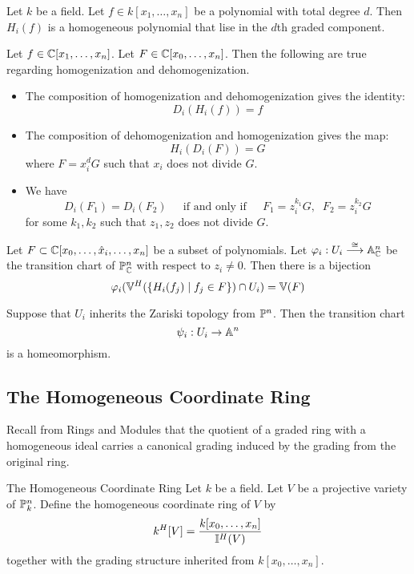 \documentclass[a4paper]{article}
\begin{document}
\begin{lmm}{}{} Let $k$ be a field. Let $f\in k[x_1,\dots,x_n]$ be a polynomial with total degree $d$. Then $H_i(f)$ is a homogeneous polynomial that lise in the $d$th graded component. 
\end{lmm}

\begin{prp}{}{} Let $f\in\mathbb{C}[x_1,\dots,x_n]$. Let $F\in\mathbb{C}[x_0,\dots,x_n]$. Then the following are true regarding homogenization and dehomogenization. 
\begin{itemize}
\item The composition of homogenization and dehomogenization gives the identity: $$D_i(H_i(f))=f$$
\item The composition of dehomogenization and homogenization gives the map: $$H_i(D_i(F))=G$$ where $F=x_i^dG$ such that $x_i$ does not divide $G$. 
\item We have $$D_i(F_1)=D_i(F_2)\;\;\;\;\text{ if and only if }\;\;\;\;F_1=z_i^{k_1}G,\;\;F_2=z_i^{k_2}G$$ for some $k_1,k_2$ such that $z_1,z_2$ does not divide $G$. 
\end{itemize}
\end{prp}

\begin{crl}{}{} Let $F\subset\mathbb{C}[x_0,\dots,\hat{x}_i,\dots,x_n]$ be a subset of polynomials. Let $\varphi_i:U_i\overset{\cong}{\longrightarrow}\mathbb{A}_{\mathbb{C}}^n$ be the transition chart of $\mathbb{P}_{\mathbb{C}}^n$ with respect to $z_i\neq 0$. Then there is a bijection $$\varphi_i(\mathbb{V}^H(\{H_i(f_j)\;|\;f_j\in F\})\cap U_i)=\mathbb{V}(F)$$
\end{crl}

\begin{crl}{}{} Suppose that $U_i$ inherits the Zariski topology from $\mathbb{P}^n$. Then the transition chart $$\psi_i:U_i\to\mathbb{A}^n$$ is a homeomorphism. 
\end{crl}

\subsection{The Homogeneous Coordinate Ring}
Recall from Rings and Modules that the quotient of a graded ring with a homogeneous ideal carries a canonical grading induced by the grading from the original ring. 

\begin{defn}{The Homogeneous Coordinate Ring}{} Let $k$ be a field. Let $V$ be a projective variety of $\mathbb{P}_k^n$. Define the homogeneous coordinate ring of $V$ by $$k^H[V]=\frac{k[x_0,\dots,x_n]}{\mathbb{I}^H(V)}$$ together with the grading structure inherited from $k[x_0,\dots,x_n]$. 
\end{defn}
\end{document}
